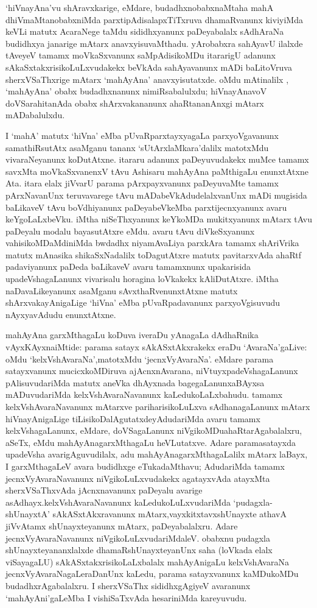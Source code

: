 `hiVnayAna'vu shAravxkarige, eMdare, budadhxnobabxnaMtaha mahA dhiVmaMta\-nobabxniMda parxtipAdisalapxTiTxruva dhamaRvanunx kiviyiMda keVLi matutx AcaraNege taMdu sididhxyanunx paDeyabalalx sAdhAraNa budidhxya janarige mAtarx anavxyisuvaMthadu. yArobabxra sahAyavU ilalxde tAveyeV tamamx moVkaSxvanunx saMpAdisikoMDu itararigU adanunx sAkaSxtakxrisikoLuLxvudakekx beVkAda sahAyavanunx mADi baLitoVruva sherxVSaThxrige mAtarx `mahAyAna' anavxyisutatxde. oMdu mAtinalilx , `mahAyAna' obabx budadhxnanunx nimiRsabalulxdu; hiVnayAnavoV doVSarahitanAda obabx shArxvakananunx ahaRtananAnxgi mAtarx mADabalulxdu.

I `mahA' matutx `hiVna' eMba pUvaRparxtayxyagaLa parxyoVgavanunx samathiRsutAtx asaMganu tananx `sUtArxlaMkara'dalilx matotxMdu vivaraNeyanunx koDutAtxne. itararu adanunx paDeyuvudakekx muMce tamamx savxMta moVkaSxvanenxV tAvu Ashisaru mahAyAna paMthigaLu enunxtAtxne Ata. itara elalx jiVvarU parama pArxpayxvanunx paDeyuvaMte tamamx pArxNavanUnx teruvavarege tAvu mADabeVkAdudelalxvanUnx mADi mugisida baLikaveV tAvu boVdhiyanunx paDeyabeVkeMba parxtijecnxyanunx avaru keYgoLaLxbeVku. iMtha niSeThxyanunx keYkoMDa mukitxyanunx mAtarx tAvu paDeyalu modalu bayasutAtxre eMdu. avaru tAvu diVkeSxyanunx vahisikoMDaMdiniMda bwdadhx niyamAvaLiya parxkAra tamamx shAriVrika matutx mAnasika shikaSxNadalilx toDagutAtxre matutx pavitarxvAda ahaRtf padaviyanunx paDeda baLikaveV avaru tamamxnunx upakarisida upadeVshagaLanunx vivarisalu horagina loVkakekx kAliDutAtxre. iMtha naDavaLikeyanunx asaMganu sAvxthaRvenunxtAtxne matutx shArxvakayAnigaLige `hiVna' eMba pUvaRpadavanunx parxyoVgisuvudu nAyxyavAdudu enunxtAtxne.

mahAyAna garxMthagaLu koDuva iveraDu yAnagaLa dAdhaRnika vAyxKAyxna\break iMtide: parama satayx sAkASxtAkxrakekx eraDu `AvaraNa'gaLive: oMdu `kelxVshAvaraNa',\break matotxMdu `jecnxVyAvaraNa'. eMdare parama satayxvanunx mucicxkoMDiruva ajAcnxnA\-varana, niVtuyxpadeVshagaLanunx pAlisuvudariMda matutx aneVka dhAyxnada bagegaLanunx\break aBAyxsa mADuvudariMda kelxVshAvaraNa\-vanunx kaLedukoLaLxbahudu. tamamx kelxVshAvaraNa\-vanunx mAtarxve pariharisikoLuLxva sAdhanagaLanunx mAtarx hiVnayAnigaLige tiLisi\-koDa\-lAgutatxdeyAdudariMda avaru tamamx kelxVshagaLanunx, eMdare, doVSagaLanunx niVgikoMDu\break ahaRtarAgabalalxru, aSeTx, eMdu mahAyAnagarxMthagaLu heVLutatxve. Adare parama\break satayxda upadeVsha avarigAguvudilalx, adu mahAyAnagarxMthagaLalilx mAtarx laBayx, I garxMthagaLeV avara budidhxge eTukadaMthavu; AdudariMda tamamx jecnxVyAvaraNavanunx niVgi\-koLuLxvudakekx agatayxvAda atayxMta sherxVSaThxvAda jAcnxnavanunx paDeyalu avarige asAdhayx.\break kelxVshAvaraNavanunx kaLedukoLuLxvudariMda `pudagxla-shUnayxtA' sAkASxtAkxravanunx mAtarx,\break vayxkitxtavxshUnayxte athavA jiVvAtamx shUnayxteyanunx mAtarx, paDeyabalalxru. Adare jecnxVyA\-varaNavanunx niVgikoLuLxvudariMdaleV. obabxnu pudagxla shUnayxteyananxlalxde dhamaR\-shUnayxte\-yanUnx saha (loVkada elalx viSayagaLU) sAkASxtakxrisikoLaLxbalalx mahAyAnigaLu kelxVshAvaraNa jecnxVyAvaraNagaLeraDanUnx kaLedu, parama satayxvanunx kaMDukoMDu budadhx\-rAgabalalxru. I sherxVSaThx sididhxgAgiyeV avaranunx `mahAyAni'gaLeMba I vishiSaTxvAda hesariniMda kareyuvudu.

